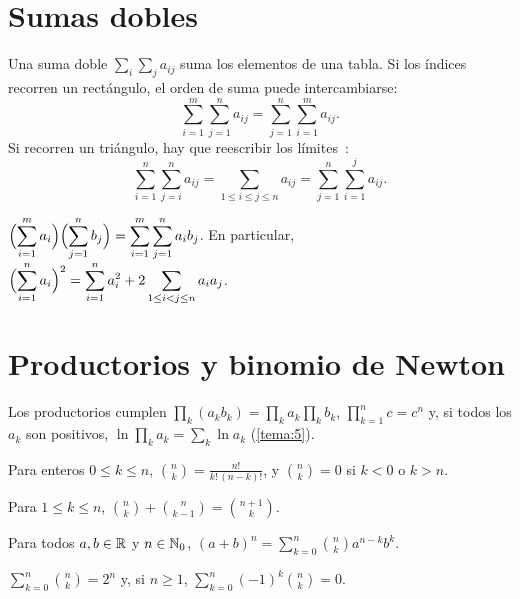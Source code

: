 \addtocounter{definicion}{1}%

\section{Sumas dobles}

Una suma doble $\sum_{i}\sum_{j}a_{ij}$ suma los elementos de una tabla. Si los índices recorren un rectángulo, el orden de suma puede intercambiarse:
\[
\sum_{i=1}^m\sum_{j=1}^na_{ij}=\sum_{j=1}^n\sum_{i=1}^ma_{ij}.
\]
Si recorren un triángulo, hay que reescribir los límites~\cite[§2.4]{gkp}:
\[
\sum_{i=1}^n\sum_{j=i}^na_{ij}=\sum_{1\le i\le j\le n}a_{ij}=\sum_{j=1}^n\sum_{i=1}^ja_{ij}.
\]

\begin{proposicion}\label{prop:producto-sumas}
$\displaystyle\Bigl(\sum_{i=1}^ma_i\Bigr)\Bigl(\sum_{j=1}^nb_j\Bigr)=\sum_{i=1}^m\sum_{j=1}^na_ib_j$. En particular, $\displaystyle\Bigl(\sum_{i=1}^na_i\Bigr)^2=\sum_{i=1}^na_i^2+2\sum_{1\le i<j\le n}a_ia_j$.
\end{proposicion}

\addtocounter{definicion}{1}%

\section{Productorios y binomio de Newton}

Los productorios cumplen $\prod_k(a_kb_k)=\prod_ka_k\prod_kb_k$, $\prod_{k=1}^nc=c^n$ y, si todos los $a_k$ son positivos, $\ln\prod_ka_k=\sum_k\ln a_k$ (\cref{tema:5}).

\begin{definicion}
Para enteros $0\le k\le n$, $\displaystyle\binom nk=\frac{n!}{k!\,(n-k)!}$, y $\binom nk=0$ si $k<0$ o $k>n$.
\end{definicion}

\begin{lema}\label{lem:pascal}
Para $1\le k\le n$, $\displaystyle\binom nk+\binom n{k-1}=\binom{n+1}k$.
\end{lema}

\begin{teorema}\label{teo:binomio}
Para todos $a,b\in\mathbb{R}$ y $n\in\mathbb{N}_0$, $\displaystyle(a+b)^n=\sum_{k=0}^n\binom nka^{n-k}b^k$.
\end{teorema}

\begin{corolario}\label{cor:binomio}
$\displaystyle\sum_{k=0}^n\binom nk=2^n$ y, si $n\ge1$, $\displaystyle\sum_{k=0}^n(-1)^k\binom nk=0$.
\end{corolario}

\addtocounter{definicion}{1}%

\addtocounter{definicion}{1}%

